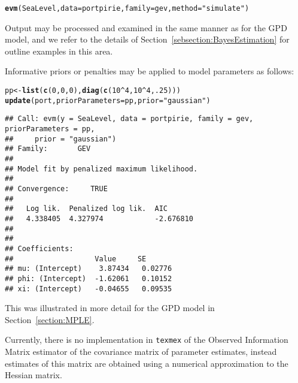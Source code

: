 \documentclass[10pt]{article}\usepackage[]{graphicx}\usepackage[]{color}
\makeatletter
\newcommand{\hlnum}[1]{\textcolor[rgb]{0.686,0.059,0.569}{#1}}%
\newcommand{\hlstr}[1]{\textcolor[rgb]{0.192,0.494,0.8}{#1}}%
\newcommand{\hlopt}[1]{\textcolor[rgb]{0,0,0}{#1}}%
\newcommand{\hlstd}[1]{\textcolor[rgb]{0.345,0.345,0.345}{#1}}%
\newcommand{\hlkwb}[1]{\textcolor[rgb]{0.69,0.353,0.396}{#1}}%
\newcommand{\hlkwc}[1]{\textcolor[rgb]{0.333,0.667,0.333}{#1}}%
\newcommand{\hlkwd}[1]{\textcolor[rgb]{0.737,0.353,0.396}{\textbf{#1}}}%
\newenvironment{kframe}{%
 \def\at@end@of@kframe{}%
 \ifinner\ifhmode%
  \def\at@end@of@kframe{\end{minipage}}%
  \begin{minipage}{\columnwidth}%
 \fi\fi%
 \def\FrameCommand##1{\hskip\@totalleftmargin \hskip-\fboxsep
 \colorbox{shadecolor}{##1}\hskip-\fboxsep
     \hskip-\linewidth \hskip-\@totalleftmargin \hskip\columnwidth}%
 \MakeFramed {\advance\hsize-\width
   \@totalleftmargin\z@ \linewidth\hsize
   \@setminipage}}%
 {\par\unskip\endMakeFramed%
 \at@end@of@kframe}
\newenvironment{knitrout}{}{} %
\makeatother
\begin{document}
\begin{knitrout}
\color{fgcolor}\begin{kframe}
\begin{alltt}
\hlkwd{evm}\hlstd{(SeaLevel,}\hlkwc{data}\hlstd{=portpirie,}\hlkwc{family}\hlstd{=gev,}\hlkwc{method}\hlstd{=}\hlstr{"simulate"}\hlstd{)}
\end{alltt}
\end{kframe}
\end{knitrout}
Output may be processed and examined in the same manner as for the GPD model, and we refer to the details of Section~\ref{sebsection:BayesEstimation} for outline examples in this area.

Informative priors or penalties may be applied to model parameters as follows:
\begin{knitrout}
\color{fgcolor}\begin{kframe}
\begin{alltt}
\hlstd{pp} \hlkwb{<-} \hlkwd{list}\hlstd{(}\hlkwd{c}\hlstd{(}\hlnum{0}\hlstd{,} \hlnum{0}\hlstd{,} \hlnum{0}\hlstd{),} \hlkwd{diag}\hlstd{(}\hlkwd{c}\hlstd{(}\hlnum{10}\hlopt{^}\hlnum{4}\hlstd{,} \hlnum{10}\hlopt{^}\hlnum{4}\hlstd{,} \hlnum{.25}\hlstd{)))}
\hlkwd{update}\hlstd{(port,} \hlkwc{priorParameters} \hlstd{= pp,} \hlkwc{prior}\hlstd{=}\hlstr{"gaussian"}\hlstd{)}
\end{alltt}
\begin{verbatim}
## Call: evm(y = SeaLevel, data = portpirie, family = gev, priorParameters = pp, 
##     prior = "gaussian")
## Family:       GEV 
## 
## Model fit by penalized maximum likelihood.
## 
## Convergence:		TRUE
## 
##   Log lik.  Penalized log lik.  AIC      
##   4.338405  4.327974            -2.676810
## 
## 
## Coefficients:
##                   Value     SE      
## mu: (Intercept)    3.87434   0.02776
## phi: (Intercept)  -1.62061   0.10152
## xi: (Intercept)   -0.04655   0.09535
\end{verbatim}
\end{kframe}
\end{knitrout}
This was illustrated in more detail for the GPD model in Section~\ref{section:MPLE}.

Currently, there is no implementation in {\tt texmex} of the Observed Information Matrix estimator of the covariance matrix of parameter estimates, instead estimates of this matrix are obtained using a numerical approximation to the Hessian matrix.
\end{document}
